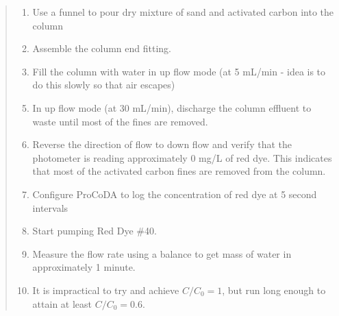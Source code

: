 \documentclass[letterpaper,10pt,english]{sphinxmanual}
\begin{document}
\begin{quote}
\begin{enumerate}
\end{enumerate}
\begin{enumerate}
\item {} 
Use a funnel to pour dry mixture of sand and activated carbon into the column

\item {} 
Assemble the column end fitting.

\item {} 
Fill the column with water in up flow mode (at 5 mL/min - idea is to do this slowly so that air escapes)

\end{enumerate}
\begin{enumerate}
\setcounter{enumi}{4}
\item {} 
In up flow mode (at 30 mL/min), discharge the column effluent to waste until most of the fines are removed.

\item {} 
Reverse the direction of flow to down flow and verify that the photometer is reading approximately 0 mg/L of red dye. This indicates that most of the activated carbon fines are removed from the column.

\item {} 
Configure ProCoDA to log the concentration of red dye at 5 second intervals

\item {} 
Start pumping Red Dye \#40.

\item {} 
Measure the flow rate using a balance to get mass of water in approximately 1 minute.

\item {} 
It is impractical to try and achieve \(C/C_0 = 1\), but run long enough to attain at least \(C/C_0 = 0.6\).

\end{enumerate}
\end{quote}
\end{document}
